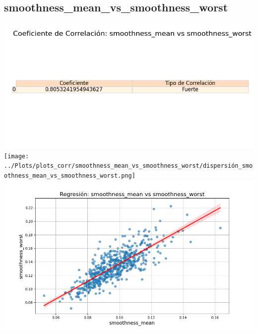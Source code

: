 \documentclass[a4paper, 12pt]{article}
\begin{document}
\subsection{smoothness\_mean\_vs\_smoothness\_worst}
    \includegraphics[width = \textwidth]{../Plots/plots_corr/smoothness_mean_vs_smoothness_worst/coeficiente_correlacion_smoothness_mean_vs_smoothness_worst.png}
    \texttt{[image: ../Plots/plots\_corr/smoothness\_mean\_vs\_smoothness\_worst/dispersión\_smoothness\_mean\_vs\_smoothness\_worst.png]}
    \includegraphics[width = \textwidth]{../Plots/plots_corr/smoothness_mean_vs_smoothness_worst/regresion_smoothness_mean_vs_smoothness_worst.png}
\end{document}
